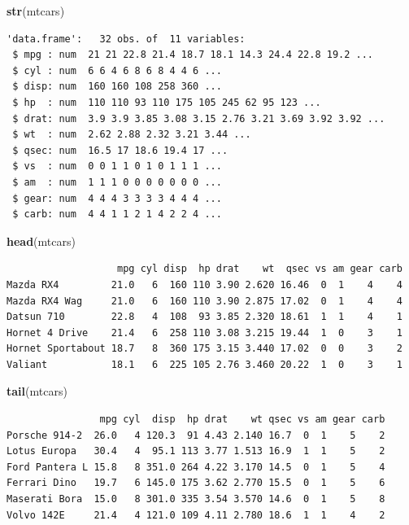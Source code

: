 \documentclass[
]{book}
\newenvironment{Shaded}{\begin{snugshade}}{\end{snugshade}}
\newcommand{\KeywordTok}[1]{\textcolor[rgb]{0.13,0.29,0.53}{\textbf{#1}}}
\newcommand{\NormalTok}[1]{#1}
\begin{document}
\begin{Shaded}
\begin{Highlighting}[]
\KeywordTok{str}\NormalTok{(mtcars)}
\end{Highlighting}
\end{Shaded}

\begin{verbatim}
'data.frame':	32 obs. of  11 variables:
 $ mpg : num  21 21 22.8 21.4 18.7 18.1 14.3 24.4 22.8 19.2 ...
 $ cyl : num  6 6 4 6 8 6 8 4 4 6 ...
 $ disp: num  160 160 108 258 360 ...
 $ hp  : num  110 110 93 110 175 105 245 62 95 123 ...
 $ drat: num  3.9 3.9 3.85 3.08 3.15 2.76 3.21 3.69 3.92 3.92 ...
 $ wt  : num  2.62 2.88 2.32 3.21 3.44 ...
 $ qsec: num  16.5 17 18.6 19.4 17 ...
 $ vs  : num  0 0 1 1 0 1 0 1 1 1 ...
 $ am  : num  1 1 1 0 0 0 0 0 0 0 ...
 $ gear: num  4 4 4 3 3 3 3 4 4 4 ...
 $ carb: num  4 4 1 1 2 1 4 2 2 4 ...
\end{verbatim}

\begin{Shaded}
\begin{Highlighting}[]
\KeywordTok{head}\NormalTok{(mtcars)}
\end{Highlighting}
\end{Shaded}

\begin{verbatim}
                   mpg cyl disp  hp drat    wt  qsec vs am gear carb
Mazda RX4         21.0   6  160 110 3.90 2.620 16.46  0  1    4    4
Mazda RX4 Wag     21.0   6  160 110 3.90 2.875 17.02  0  1    4    4
Datsun 710        22.8   4  108  93 3.85 2.320 18.61  1  1    4    1
Hornet 4 Drive    21.4   6  258 110 3.08 3.215 19.44  1  0    3    1
Hornet Sportabout 18.7   8  360 175 3.15 3.440 17.02  0  0    3    2
Valiant           18.1   6  225 105 2.76 3.460 20.22  1  0    3    1
\end{verbatim}

\begin{Shaded}
\begin{Highlighting}[]
\KeywordTok{tail}\NormalTok{(mtcars)}
\end{Highlighting}
\end{Shaded}

\begin{verbatim}
                mpg cyl  disp  hp drat    wt qsec vs am gear carb
Porsche 914-2  26.0   4 120.3  91 4.43 2.140 16.7  0  1    5    2
Lotus Europa   30.4   4  95.1 113 3.77 1.513 16.9  1  1    5    2
Ford Pantera L 15.8   8 351.0 264 4.22 3.170 14.5  0  1    5    4
Ferrari Dino   19.7   6 145.0 175 3.62 2.770 15.5  0  1    5    6
Maserati Bora  15.0   8 301.0 335 3.54 3.570 14.6  0  1    5    8
Volvo 142E     21.4   4 121.0 109 4.11 2.780 18.6  1  1    4    2
\end{verbatim}
\end{document}
